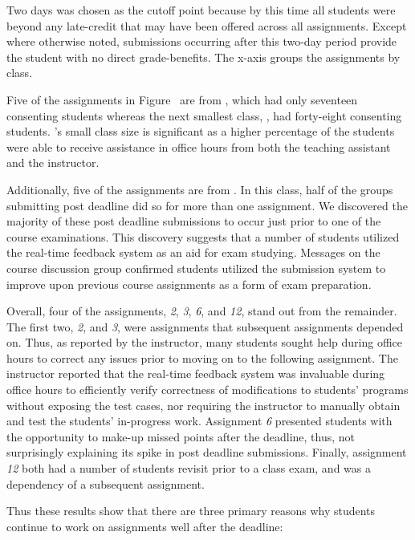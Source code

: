 Two days was chosen as the cutoff point because by this time all students were
beyond any late-credit that may have been offered across all
assignments. Except where otherwise noted, submissions occurring after this
two-day period provide the student with no direct grade-benefits. The x-axis
groups the assignments by class.

Five of the assignments in Figure~ are from ,
which had only seventeen consenting students whereas the next smallest class,
, had forty-eight consenting students. 's small class
size is significant as a higher percentage of the students were able to receive
assistance in office hours from both the teaching assistant and the instructor.

Additionally, five of the assignments are from . In this class, half
of the groups submitting post deadline did so for more than one assignment. We
discovered the majority of these post deadline submissions to occur just prior
to one of the course examinations. This discovery suggests that a number of
students utilized the real-time feedback system as an aid for exam
studying. Messages on the course discussion group confirmed students utilized
the submission system to improve upon previous course assignments as a form of
exam preparation.

Overall, four of the assignments, \emph{2}, \emph{3}, \emph{6}, and \emph{12},
stand out from the remainder. The first two, \emph{2}, and \emph{3}, were
assignments that subsequent assignments depended on. Thus, as reported by the
instructor, many students sought help during office hours to correct any issues
prior to moving on to the following assignment. The instructor reported that
the real-time feedback system was invaluable during office hours to efficiently
verify correctness of modifications to students' programs without exposing the
test cases, nor requiring the instructor to manually obtain and test the
students' in-progress work. Assignment \emph{6} presented students with the
opportunity to make-up missed points after the deadline, thus, not surprisingly
explaining its spike in post deadline submissions. Finally, assignment
\emph{12} both had a number of students revisit prior to a class exam, and was
a dependency of a subsequent assignment.

Thus these results show that there are three primary reasons why students
continue to work on assignments well after the deadline:

